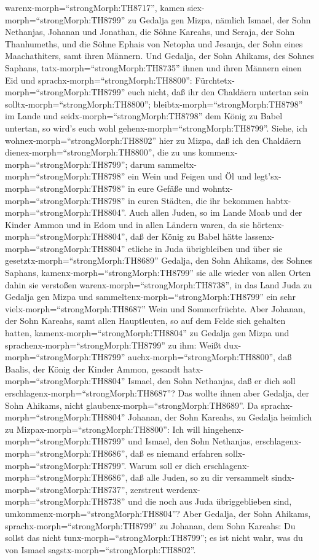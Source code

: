 warenx-morph=``strongMorph:TH8717'',  kamen
siex-morph=``strongMorph:TH8799'' zu Gedalja gen Mizpa, nämlich Ismael,
der Sohn Nethanjas, Johanan und Jonathan, die Söhne Kareahs, und Seraja,
der Sohn Thanhumeths, und die Söhne Ephais von Netopha und Jesanja, der
Sohn eines Maachathiters, samt ihren Männern.  Und Gedalja,
der Sohn Ahikams, des Sohnes Saphans, tatx-morph=``strongMorph:TH8735''
ihnen und ihren Männern einen Eid und
sprachx-morph=``strongMorph:TH8800'':
Fürchtetx-morph=``strongMorph:TH8799'' euch nicht, daß ihr den Chaldäern
untertan sein solltx-morph=``strongMorph:TH8800'';
bleibtx-morph=``strongMorph:TH8798'' im Lande und
seidx-morph=``strongMorph:TH8798'' dem König zu Babel untertan, so
wird's euch wohl gehenx-morph=``strongMorph:TH8799''. 
Siehe, ich wohnex-morph=``strongMorph:TH8802'' hier zu Mizpa, daß ich
den Chaldäern dienex-morph=``strongMorph:TH8800'', die zu uns
kommenx-morph=``strongMorph:TH8799''; darum
sammeltx-morph=``strongMorph:TH8798'' ein Wein und Feigen und Öl und
legt'sx-morph=``strongMorph:TH8798'' in eure Gefäße und
wohntx-morph=``strongMorph:TH8798'' in euren Städten, die ihr bekommen
habtx-morph=``strongMorph:TH8804''.  Auch allen Juden, so
im Lande Moab und der Kinder Ammon und in Edom und in allen Ländern
waren, da sie hörtenx-morph=``strongMorph:TH8804'', daß der König zu
Babel hätte lassenx-morph=``strongMorph:TH8804'' etliche in Juda
übrigbleiben und über sie gesetztx-morph=``strongMorph:TH8689'' Gedalja,
den Sohn Ahikams, des Sohnes Saphans, 
kamenx-morph=``strongMorph:TH8799'' sie alle wieder von allen Orten
dahin sie verstoßen warenx-morph=``strongMorph:TH8738'', in das Land
Juda zu Gedalja gen Mizpa und sammeltenx-morph=``strongMorph:TH8799''
ein sehr vielx-morph=``strongMorph:TH8687'' Wein und Sommerfrüchte.
 Aber Johanan, der Sohn Kareahs, samt allen Hauptleuten, so
auf dem Felde sich gehalten hatten, kamenx-morph=``strongMorph:TH8804''
zu Gedalja gen Mizpa  und
sprachenx-morph=``strongMorph:TH8799'' zu ihm: Weißt
dux-morph=``strongMorph:TH8799'' auchx-morph=``strongMorph:TH8800'', daß
Baalis, der König der Kinder Ammon, gesandt
hatx-morph=``strongMorph:TH8804'' Ismael, den Sohn Nethanjas, daß er
dich soll erschlagenx-morph=``strongMorph:TH8687''? Das wollte ihnen
aber Gedalja, der Sohn Ahikams, nicht
glaubenx-morph=``strongMorph:TH8689''.  Da
sprachx-morph=``strongMorph:TH8804'' Johanan, der Sohn Kareahs, zu
Gedalja heimlich zu Mizpax-morph=``strongMorph:TH8800'': Ich will
hingehenx-morph=``strongMorph:TH8799'' und Ismael, den Sohn Nethanjas,
erschlagenx-morph=``strongMorph:TH8686'', daß es niemand erfahren
sollx-morph=``strongMorph:TH8799''. Warum soll er dich
erschlagenx-morph=``strongMorph:TH8686'', daß alle Juden, so zu dir
versammelt sindx-morph=``strongMorph:TH8737'', zerstreut
werdenx-morph=``strongMorph:TH8738'' und die noch aus Juda
übriggeblieben sind, umkommenx-morph=``strongMorph:TH8804''?
 Aber Gedalja, der Sohn Ahikams,
sprachx-morph=``strongMorph:TH8799'' zu Johanan, dem Sohn Kareahs: Du
sollst das nicht tunx-morph=``strongMorph:TH8799''; es ist nicht wahr,
was du von Ismael sagstx-morph=``strongMorph:TH8802''.


